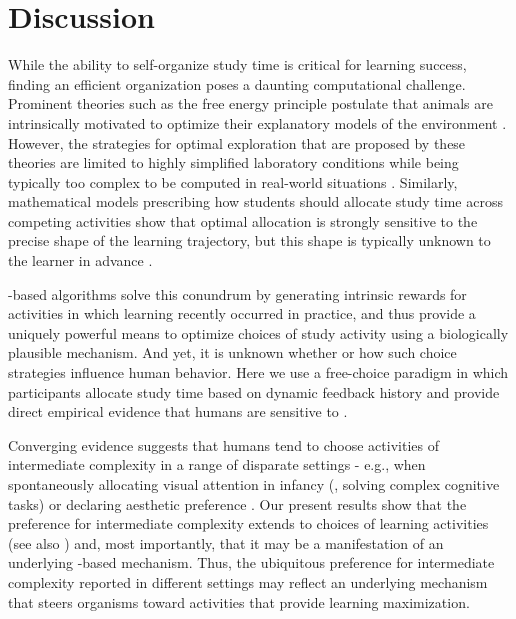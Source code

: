 \section{Discussion}
    While the ability to self-organize study time is critical for learning success, finding an efficient organization poses a daunting computational challenge. Prominent theories such as the free energy principle postulate that animals are intrinsically motivated to optimize their explanatory models of the environment \cite{collins2014human,schwartenbeck2019computational}. However, the strategies for optimal exploration that are proposed by these theories are limited to highly simplified laboratory conditions while being typically too complex to be computed in real-world situations \cite{cohen2007should}. Similarly, mathematical models prescribing how students should allocate study time across competing activities show that optimal allocation is strongly sensitive to the precise shape of the learning trajectory, but this shape is typically unknown to the learner in advance \cite{son2006metacognitive}. 
    
    {\LP}-based algorithms solve this conundrum by generating intrinsic rewards for activities in which  learning recently occurred in practice, and thus provide a uniquely powerful means to optimize choices of study activity using a biologically plausible  mechanism. And yet, it is unknown whether or how such choice strategies influence human behavior. Here we use a free-choice paradigm in which participants allocate study time based on dynamic feedback history and provide direct empirical evidence that humans are sensitive to {\LP}.
    
    Converging evidence suggests that humans tend to choose activities of intermediate complexity in a range of disparate settings - e.g., when spontaneously allocating visual attention in infancy (\cite{kidd2012goldilocks}, solving complex cognitive tasks) or declaring aesthetic preference \cite{tsutsui2011complexity,gold2019predictability,sauve2019information}. Our present results show that the preference for intermediate complexity extends to choices of learning activities (see also \cite{baranes2014effects}) and, most importantly, that it may be a manifestation of an underlying {\LP}-based mechanism. Thus, the ubiquitous preference for intermediate complexity reported in different settings may reflect an underlying mechanism that steers organisms toward activities that provide learning maximization.
   
